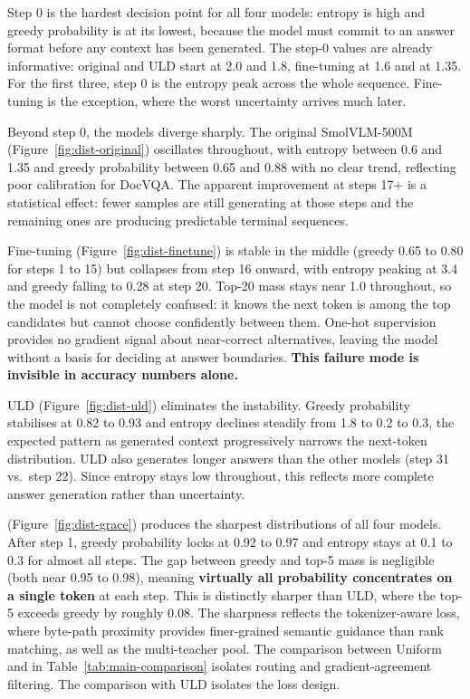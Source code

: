 Step 0 is the hardest decision point for all four models: entropy is high
and greedy probability is at its lowest, because the model must commit to
an answer format before any context has been generated. The step-0 values
are already informative: original and ULD start at 2.0 and 1.8, fine-tuning
at 1.6 and \methodname{} at 1.35. For the first three, step 0 is the entropy
peak across the whole sequence. Fine-tuning is the exception, where the
worst uncertainty arrives much later.

Beyond step 0, the models diverge sharply. The original SmolVLM-500M
(Figure~\ref{fig:dist-original}) oscillates throughout, with entropy
between 0.6 and 1.35 and greedy probability between 0.65 and 0.88 with
no clear trend, reflecting poor calibration for DocVQA. The apparent
improvement at steps 17+ is a statistical effect: fewer samples are still
generating at those steps and the remaining ones are producing predictable
terminal sequences.

Fine-tuning (Figure~\ref{fig:dist-finetune}) is stable in the middle
(greedy 0.65 to 0.80 for steps 1 to 15) but collapses from step 16 onward,
with entropy peaking at 3.4 and greedy falling to 0.28 at step 20. Top-20
mass stays near 1.0 throughout, so the model is not completely confused:
it knows the next token is among the top candidates but cannot choose
confidently between them. One-hot supervision provides no gradient signal
about near-correct alternatives, leaving the model without a basis for
deciding at answer boundaries. \textbf{This failure mode is invisible in accuracy
numbers alone.}

ULD (Figure~\ref{fig:dist-uld}) eliminates the instability. Greedy
probability stabilises at 0.82 to 0.93 and entropy declines steadily from
1.8 to 0.2 to 0.3, the expected pattern as generated context progressively
narrows the next-token distribution. ULD also generates longer answers than
the other models (step 31 vs.\ step 22). Since entropy stays low throughout,
this reflects more complete answer generation rather than uncertainty.

\methodname{} (Figure~\ref{fig:dist-grace}) produces the sharpest
distributions of all four models. After step 1, greedy probability locks
at 0.92 to 0.97 and entropy stays at 0.1 to 0.3 for almost all steps. The
gap between greedy and top-5 mass is negligible (both near 0.95 to 0.98),
meaning \textbf{virtually all probability concentrates on a single token} at each
step. This is distinctly sharper than ULD, where the top-5 exceeds greedy
by roughly 0.08. The sharpness reflects the tokenizer-aware loss, where
byte-path proximity provides finer-grained semantic guidance than rank
matching, as well as the multi-teacher pool. The comparison between Uniform
and \methodname{} in Table~\ref{tab:main-comparison} isolates routing and
gradient-agreement filtering. The comparison with ULD isolates the loss
design.

